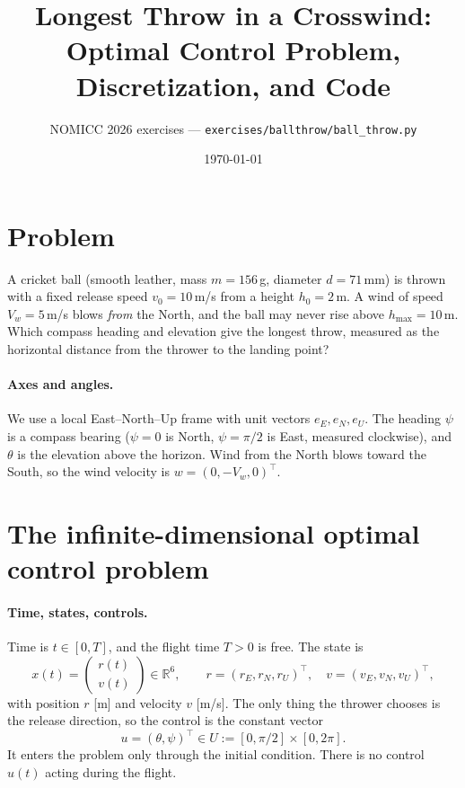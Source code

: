 \documentclass[11pt]{article}
\title{Longest Throw in a Crosswind:\\ Optimal Control Problem, Discretization, and Code}
\author{NOMICC 2026 exercises --- \texttt{exercises/ballthrow/ball\_throw.py}}
\date{\today}
\newcommand{\R}{\mathbb{R}}
\begin{document}
\maketitle

\section{Problem}

A cricket ball (smooth leather, mass $m = 156$\,g, diameter $d = 71$\,mm) is thrown with a fixed
release speed $v_0 = 10$\,m/s from a height $h_0 = 2$\,m. A wind of speed $V_w = 5$\,m/s blows
\emph{from} the North, and the ball may never rise above $h_{\max} = 10$\,m.
Which compass heading and elevation give the longest throw, measured as the horizontal distance
from the thrower to the landing point?

\paragraph{Axes and angles.} We use a local East--North--Up frame with unit vectors
$e_E, e_N, e_U$. The heading $\psi$ is a compass bearing ($\psi=0$ is North, $\psi=\pi/2$ is East,
measured clockwise), and $\theta$ is the elevation above the horizon. Wind from the North
blows toward the South, so the wind velocity is $w = (0,-V_w,0)^\top$.

\section{The infinite-dimensional optimal control problem}

\paragraph{Time, states, controls.}
Time is $t \in [0,T]$, and the flight time $T>0$ is free. The state is
\[
  x(t) = \begin{pmatrix} r(t) \\ v(t) \end{pmatrix} \in \R^6,\qquad
  r = (r_E, r_N, r_U)^\top,\quad v = (v_E, v_N, v_U)^\top,
\]
with position $r$ [m] and velocity $v$ [m/s]. The only thing the thrower chooses is the release
direction, so the control is the constant vector
\[
  u = (\theta,\psi)^\top \in U := [0,\pi/2]\times[0,2\pi].
\]
It enters the problem only through the initial condition. There is no control
$u(t)$ acting during the flight.
\end{document}
